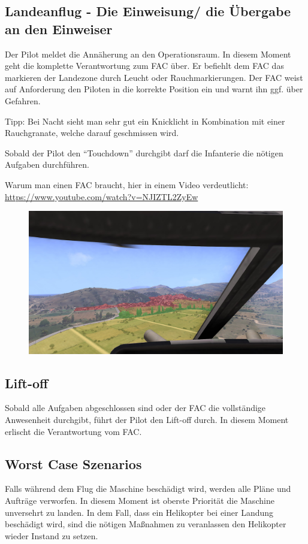 \subsection{Landeanflug - Die Einweisung/ die Übergabe an den Einweiser}
	Der Pilot meldet die Annäherung an den Operationsraum. In diesem Moment geht die komplette Verantwortung zum FAC über. Er befiehlt dem FAC das markieren der Landezone durch Leucht oder Rauchmarkierungen. Der FAC weist auf Anforderung den Piloten in die korrekte Position ein und warnt ihn ggf. über Gefahren.\par
	Tipp: Bei Nacht sieht man sehr gut ein Knicklicht in Kombination mit einer Rauchgranate, welche darauf geschmissen wird.
	\par\medskip
	Sobald der Pilot den “Touchdown” durchgibt darf die Infanterie die nötigen Aufgaben durchführen.\par
	Warum man einen FAC braucht, hier in einem Video verdeutlicht:\\
	\url{https://www.youtube.com/watch?v=NJIZTL2ZyEw}

	\begin{figure}[htbp]
		\centering
		\includegraphics[width=0.95\linewidth]{../img/advanced/hubschrauber_+_infanterie/sicht-pilot}
	\end{figure}

\subsection{Lift-off}
	Sobald alle Aufgaben abgeschlossen sind oder der FAC die vollständige Anwesenheit durchgibt, führt der Pilot den Lift-off durch. In diesem Moment erlischt die Verantwortung vom FAC. 

\subsection{Worst Case Szenarios}
	Falls während dem Flug die Maschine beschädigt wird, werden alle Pläne und Aufträge verworfen. In diesem Moment ist oberste Priorität die Maschine unversehrt zu landen. In dem Fall, dass ein Helikopter bei einer Landung beschädigt wird, sind die nötigen Maßnahmen zu veranlassen den Helikopter wieder Instand zu setzen.